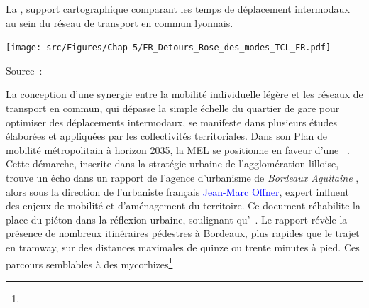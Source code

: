 \begin{refsegment}
    \begin{carte}[h!]\vspace*{4pt}
        \caption{La , support cartographique comparant les temps de déplacement intermodaux au sein du réseau de transport en commun lyonnais.}
        \label{fig-chap5:rose-modes-reseau-tcl}
        \centerline{\texttt{[image: src/Figures/Chap-5/FR\_Detours\_Rose\_des\_modes\_TCL\_FR.pdf]}}
        \vspace{5pt}
        \begin{flushright}\scriptsize{
        Source~: \textcolor{blue}{\textcite{tcl_transports_2023}}
        }\end{flushright}
    \end{carte}
    
La conception d'une synergie entre la mobilité individuelle légère et les réseaux de transport en commun, qui dépasse la simple échelle du quartier de gare pour optimiser des déplacements intermodaux, se manifeste dans plusieurs études élaborées et appliquées par les collectivités territoriales. Dans son Plan de mobilité métropolitain à horizon 2035, la \acrshort{MEL} se positionne en faveur d'une ~\textcolor{blue}{\autocite[328]{conseil_de_developpement_de_la_mel_plan_2022}}. Cette démarche, inscrite dans la stratégie urbaine de l'agglomération lilloise, trouve un écho dans un rapport de l'agence d'urbanisme de \textsl{Bordeaux Aquitaine} \textcolor{blue}{\textcite{aurba_itineraires_2017}}, alors sous la direction de l'urbaniste français \textcolor{blue}{Jean-Marc Offner}, expert influent des enjeux de mobilité et d'aménagement du territoire. Ce document réhabilite la place du piéton dans la réflexion urbaine, soulignant qu'~\textcolor{blue}{\autocite[3, 14, 24]{aurba_itineraires_2017}}. Le rapport révèle la présence de nombreux itinéraires pédestres à Bordeaux, plus rapides que le trajet en tramway, sur des distances maximales de quinze ou trente minutes à pied. Ces parcours semblables à des mycorhizes\footnote{
}
\end{refsegment}
